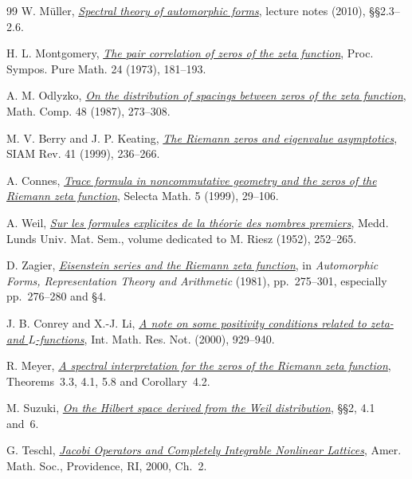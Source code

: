 \documentclass[11pt,letterpaper]{article}
\numberwithin{equation}{section}
\begin{document}
\begin{thebibliography}{99}
 W. M\"uller, \href{https://www.math.uni-bonn.de/people/mueller/skripte/specauto.pdf}{\emph{Spectral theory of automorphic forms}}, lecture notes (2010), \S\S2.3--2.6.

 H. L. Montgomery, \href{https://public.websites.umich.edu/hlm/paircor1.pdf}{\emph{The pair correlation of zeros of the zeta function}}, Proc. Sympos. Pure Math. 24 (1973), 181--193.

 A. M. Odlyzko, \href{https://www-users.cse.umn.edu/~odlyzko/doc/arch/zeta.zero.spacing.pdf}{\emph{On the distribution of spacings between zeros of the zeta function}}, Math. Comp. 48 (1987), 273--308.

 M. V. Berry and J. P. Keating, \href{https://michaelberryphysics.wordpress.com/wp-content/uploads/2013/06/berry307.pdf}{\emph{The Riemann zeros and eigenvalue asymptotics}}, SIAM Rev. 41 (1999), 236--266.

 A. Connes, \href{https://arxiv.org/abs/math/9811068}{\emph{Trace formula in noncommutative geometry and the zeros of the Riemann zeta function}}, Selecta Math. 5 (1999), 29--106.

 A. Weil, \href{https://denisevellachemla.eu/transc-Weil-1952.pdf}{\emph{Sur les formules explicites de la th\'eorie des nombres premiers}}, Medd. Lunds Univ. Mat. Sem., volume dedicated to M. Riesz (1952), 252--265.

 D. Zagier, \href{https://people.mpim-bonn.mpg.de/zagier/files/scanned/EisensteinRiemannZeta/fulltext.pdf}{\emph{Eisenstein series and the Riemann zeta function}}, in \emph{Automorphic Forms, Representation Theory and Arithmetic} (1981), pp.~275--301, especially pp.~276--280 and \S4.

 J. B. Conrey and X.-J. Li, \href{https://arxiv.org/abs/math/9812166}{\emph{A note on some positivity conditions related to zeta- and $L$-functions}}, Int. Math. Res. Not. (2000), 929--940.

 R. Meyer,
\href{https://arxiv.org/abs/math/0412277}{\emph{A spectral interpretation for the zeros of the Riemann zeta function}},
Theorems~3.3, 4.1, 5.8 and Corollary~4.2.

 M. Suzuki,
\href{https://arxiv.org/html/2301.00421v3}{\emph{On the Hilbert space derived from the Weil distribution}}, \S\S2, 4.1 and~6.

 G. Teschl, \href{https://www.mat.univie.ac.at/~gerald/ftp/book-jac/}{\emph{Jacobi Operators and Completely Integrable Nonlinear Lattices}}, Amer. Math. Soc., Providence, RI, 2000, Ch.~2.


\end{thebibliography}
\end{document}
